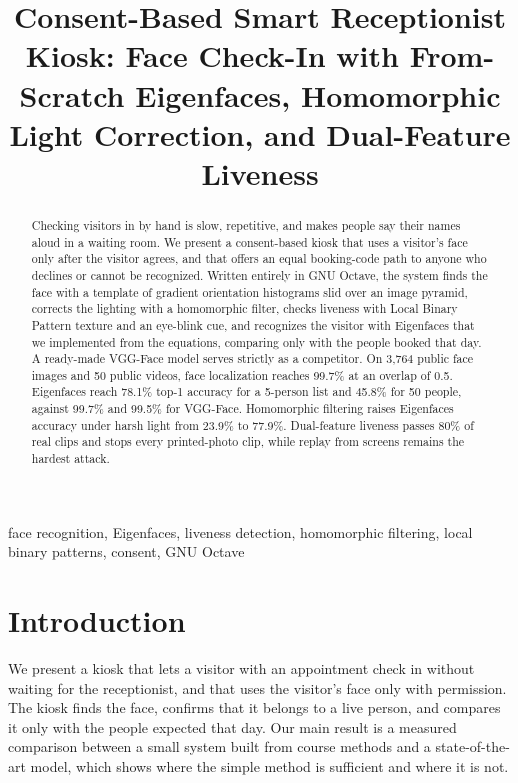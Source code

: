 \documentclass[conference,a4paper]{IEEEtran}
\begin{document}
\title{Consent-Based Smart Receptionist Kiosk: Face Check-In with From-Scratch Eigenfaces, Homomorphic Light Correction, and Dual-Feature Liveness}

\author{
}

\maketitle

\begin{abstract}
Checking visitors in by hand is slow, repetitive, and makes people say their names aloud in a waiting room. We present a consent-based kiosk that uses a visitor's face only after the visitor agrees, and that offers an equal booking-code path to anyone who declines or cannot be recognized. Written entirely in GNU Octave, the system finds the face with a template of gradient orientation histograms slid over an image pyramid, corrects the lighting with a homomorphic filter, checks liveness with Local Binary Pattern texture and an eye-blink cue, and recognizes the visitor with Eigenfaces that we implemented from the equations, comparing only with the people booked that day. A ready-made VGG-Face model serves strictly as a competitor. On 3,764 public face images and 50 public videos, face localization reaches 99.7\% at an overlap of 0.5. Eigenfaces reach 78.1\% top-1 accuracy for a 5-person list and 45.8\% for 50 people, against 99.7\% and 99.5\% for VGG-Face. Homomorphic filtering raises Eigenfaces accuracy under harsh light from 23.9\% to 77.9\%. Dual-feature liveness passes 80\% of real clips and stops every printed-photo clip, while replay from screens remains the hardest attack.
\end{abstract}

\begin{IEEEkeywords}
face recognition, Eigenfaces, liveness detection, homomorphic filtering, local binary patterns, consent, GNU Octave
\end{IEEEkeywords}

\section{Introduction}
We present a kiosk that lets a visitor with an appointment check in without waiting for the receptionist, and that uses the visitor's face only with permission. The kiosk finds the face, confirms that it belongs to a live person, and compares it only with the people expected that day. Our main result is a measured comparison between a small system built from course methods and a state-of-the-art model, which shows where the simple method is sufficient and where it is not.
\end{document}
